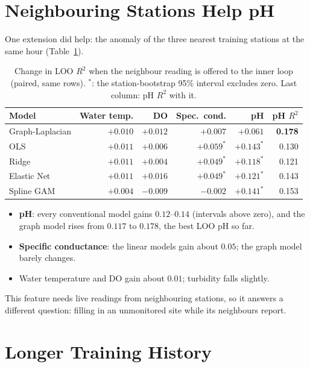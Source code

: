 \documentclass[12pt]{article}
\begin{document}
\section{Neighbouring Stations Help pH}

One extension did help: the anomaly of the three nearest training stations at the same hour
(Table~\ref{tab:nbr}).

\begin{table}[H]
\centering
\caption{Change in LOO $R^2$ when the neighbour reading is offered to the inner loop (paired, same
rows). $^{*}$: the station-bootstrap 95\% interval excludes zero. Last column: pH $R^2$ with it.}
\label{tab:nbr}
\begin{tabular}{l rrrr r}
\toprule
Model & Water temp. & DO & Spec.\ cond. & pH & pH $R^2$ \\
\midrule
Graph-Laplacian & $+0.010$ & $+0.012$ & $+0.007$ & $+0.061$ & \textbf{0.178} \\
OLS             & $+0.011$ & $+0.006$ & $+0.059^{*}$ & $+0.143^{*}$ & 0.130 \\
Ridge           & $+0.011$ & $+0.004$ & $+0.049^{*}$ & $+0.118^{*}$ & 0.121 \\
Elastic Net     & $+0.011$ & $+0.016$ & $+0.049^{*}$ & $+0.121^{*}$ & 0.143 \\
Spline GAM      & $+0.004$ & $-0.009$ & $-0.002$ & $+0.141^{*}$ & 0.153 \\
\bottomrule
\end{tabular}
\end{table}

\begin{itemize}
  \item \textbf{pH}: every conventional model gains $0.12$--$0.14$ (intervals above zero), and the
        graph model rises from $0.117$ to $0.178$, the best LOO pH so far.
  \item \textbf{Specific conductance}: the linear models gain about $0.05$; the graph model barely
        changes.
  \item Water temperature and DO gain about $0.01$; turbidity falls slightly.
\end{itemize}
This feature needs live readings from neighbouring stations, so it answers a different question:
filling in an unmonitored site while its neighbours report.

\section{Longer Training History}
\end{document}
